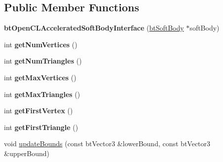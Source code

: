 \subsection*{Public Member Functions}
\begin{DoxyCompactItemize}
\item 
\mbox{\label{classbtOpenCLAcceleratedSoftBodyInterface_a0a1876d09fadf797d65cb9917ca86e87}} 
{\bfseries bt\+Open\+C\+L\+Accelerated\+Soft\+Body\+Interface} (\hyperlink{classbtSoftBody}{bt\+Soft\+Body} $\ast$soft\+Body)
\item 
\mbox{\label{classbtOpenCLAcceleratedSoftBodyInterface_a969a40bb22b69af274843499bf48416c}} 
int {\bfseries get\+Num\+Vertices} ()
\item 
\mbox{\label{classbtOpenCLAcceleratedSoftBodyInterface_a577f0e851770e756515294ca475bcef3}} 
int {\bfseries get\+Num\+Triangles} ()
\item 
\mbox{\label{classbtOpenCLAcceleratedSoftBodyInterface_a4c3cf743e4af762e1e985da0aab05412}} 
int {\bfseries get\+Max\+Vertices} ()
\item 
\mbox{\label{classbtOpenCLAcceleratedSoftBodyInterface_a500adc07a0d67e6574d30bce3e12e240}} 
int {\bfseries get\+Max\+Triangles} ()
\item 
\mbox{\label{classbtOpenCLAcceleratedSoftBodyInterface_a40343ab4b8206db1f23881944326a831}} 
int {\bfseries get\+First\+Vertex} ()
\item 
\mbox{\label{classbtOpenCLAcceleratedSoftBodyInterface_aff3b22ed5bc522dcdb53f85bfda0c730}} 
int {\bfseries get\+First\+Triangle} ()
\item 
void \hyperlink{classbtOpenCLAcceleratedSoftBodyInterface_a4ffffc49b4b4c0512de11a8884154fe9}{update\+Bounds} (const bt\+Vector3 \&lower\+Bound, const bt\+Vector3 \&upper\+Bound)
\item 
\mbox{\label{classbtOpenCLAcceleratedSoftBodyInterface_a1c2237dd7df117883a24eae0ee961e3c}} 

\end{DoxyCompactItemize}
